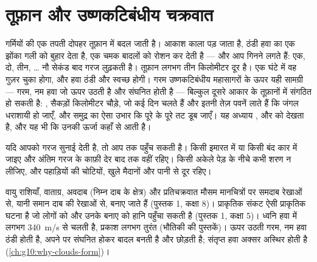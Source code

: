 \chapter{तूफ़ान और उष्णकटिबंधीय चक्रवात}\label{ch:g10:storms-and-cyclones}

गर्मियों की एक तपती दोपहर तूफ़ान में बदल जाती है। आकाश काला पड़ जाता है, ठंडी हवा का एक
झोंका गली को बुहार देता है, एक चमक बादलों को रोशन कर देती है --- और आप गिनने लगते हैं:
एक, दो, तीन, \ldots{} नौ सेकंड बाद गरज लुढ़कती है। तूफ़ान लगभग तीन किलोमीटर दूर
है। एक घंटे में वह गुज़र चुका होगा, और हवा ठंडी और स्वच्छ होगी। गरम उष्णकटिबंधीय
महासागरों के ऊपर यही सामग्री --- गरम, नम हवा जो ऊपर उठती है और संघनित होती है ---
बिल्कुल दूसरे आकार के तूफ़ानों में संगठित हो सकती है: , सैकड़ों
किलोमीटर चौड़े, जो कई दिन चलते हैं और इतनी तेज़ पवनें लाते हैं कि जंगल धराशायी हो जाएँ, और
समुद्र का ऐसा उभार कि पूरे के पूरे तट डूब जाएँ। यह अध्याय ,  और
 को देखता है, और यह भी कि उनकी ऊर्जा कहाँ से आती
है।

\begin{safety}
यदि आपको गरज सुनाई देती है, तो  आप तक पहुँच सकती है। किसी इमारत में या किसी
बंद कार में जाइए और अंतिम गरज के काफ़ी देर बाद तक वहीं रहिए। किसी अकेले पेड़ के नीचे
कभी शरण न लीजिए, और पहाड़ियों की चोटियों, खुले मैदानों और पानी से दूर रहिए।
\end{safety}

\begin{recall}
वायु राशियाँ, वाताग्र, अवदाब (निम्न दाब के क्षेत्र) और प्रतिचक्रवात
मौसम मानचित्रों पर समदाब रेखाओं से, यानी समान दाब की रेखाओं से, बनाए जाते हैं (पुस्तक 1,
कक्षा 8)। प्राकृतिक संकट ऐसी प्राकृतिक घटना है जो लोगों को और उनके बनाए
को हानि पहुँचा सकती है (पुस्तक 1, कक्षा 5)। ध्वनि हवा में लगभग
\qty{340}{m/s} से चलती है, प्रकाश लगभग तुरंत (भौतिकी की पुस्तकें)। ऊपर उठती गरम, नम
हवा ठंडी होती है, अपने  पर संघनित होकर बादल बनती है और
 छोड़ती है; संतृप्त हवा अक्सर अस्थिर होती है
(\cref{ch:g10:why-clouds-form})।
\end{recall}

